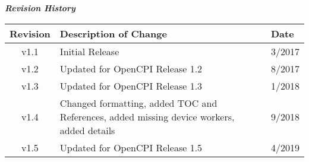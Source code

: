 \iffalse
This file is protected by Copyright. Please refer to the COPYRIGHT file
distributed with this source distribution.

This file is part of OpenCPI <http://www.opencpi.org>

OpenCPI is free software: you can redistribute it and/or modify it under the
terms of the GNU Lesser General Public License as published by the Free Software
Foundation, either version 3 of the License, or (at your option) any later
version.

OpenCPI is distributed in the hope that it will be useful, but WITHOUT ANY
WARRANTY; without even the implied warranty of MERCHANTABILITY or FITNESS FOR A
PARTICULAR PURPOSE. See the GNU Lesser General Public License for more details.

You should have received a copy of the GNU Lesser General Public License along
with this program. If not, see <http://www.gnu.org/licenses/>.
\fi

\def\docTitle{Matchstiq-Z1 BSP Case Study}
\def\snippetpath{../../../../../../doc/av/tex/snippets}

\graphicspath{{figures/}}


\maketitle
\thispagestyle{empty}
\newpage

\begin{center}
	\textit{\textbf{Revision History}}
	\begin{table}[H]
		\label{table:revisions} %
		\begin{tabularx}{\textwidth}{|c|X|l|}
			\hline
			\rowcolor{blue}
			\textbf{Revision} & \textbf{Description of Change} & \textbf{Date} \\
		    \hline
		    v1.1 & Initial Release & 3/2017 \\
		    \hline
		    v1.2 & Updated for OpenCPI Release 1.2 & 8/2017 \\
			\hline
			v1.3 & Updated for OpenCPI Release 1.3 & 1/2018 \\
			\hline
			v1.4 & Changed formatting, added TOC and References, added missing device workers, added details & 9/2018 \\
			\hline
			v1.5 & Updated for OpenCPI Release 1.5 & 4/2019 \\
			\hline
		\end{tabularx}
	\end{table}
\end{center}
\newpage

